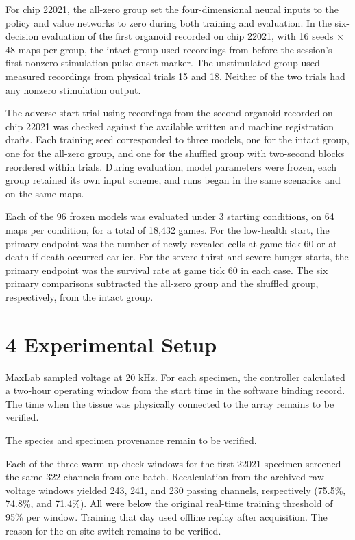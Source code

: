 \documentclass{article}
\begin{document}
For chip 22021, the all-zero group set the four-dimensional neural inputs to the policy and value networks to zero during both training and evaluation. In the six-decision evaluation of the first organoid recorded on chip 22021, with 16 seeds \ensuremath{\times} 48 maps per group, the intact group used recordings from before the session's first nonzero stimulation pulse onset marker. The unstimulated group used measured recordings from physical trials 15 and 18. Neither of the two trials had any nonzero stimulation output.


The adverse-start trial using recordings from the second organoid recorded on chip 22021 was checked against the available written and machine registration drafts. Each training seed corresponded to three models, one for the intact group, one for the all-zero group, and one for the shuffled group with two-second blocks reordered within trials. During evaluation, model parameters were frozen, each group retained its own input scheme, and runs began in the same scenarios and on the same maps.


Each of the 96 frozen models was evaluated under 3 starting conditions, on 64 maps per condition, for a total of 18,432 games. For the low-health start, the primary endpoint was the number of newly revealed cells at game tick 60 or at death if death occurred earlier. For the severe-thirst and severe-hunger starts, the primary endpoint was the survival rate at game tick 60 in each case. The six primary comparisons subtracted the all-zero group and the shuffled group, respectively, from the intact group.


\section*{4 Experimental Setup}

MaxLab sampled voltage at 20 kHz. For each specimen, the controller calculated a two-hour operating window from the start time in the software binding record. The time when the tissue was physically connected to the array remains to be verified.


The species and specimen provenance remain to be verified.


Each of the three warm-up check windows for the first 22021 specimen screened the same 322 channels from one batch. Recalculation from the archived raw voltage windows yielded 243, 241, and 230 passing channels, respectively (75.5\%, 74.8\%, and 71.4\%). All were below the original real-time training threshold of 95\% per window. Training that day used offline replay after acquisition. The reason for the on-site switch remains to be verified.
\end{document}
